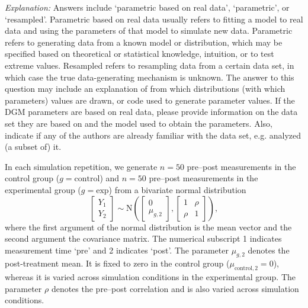 \documentclass[12pt]{article}
\begin{document}
\textit{Explanation:} Answers include `parametric based on real data', `parametric', or `resampled'. Parametric based on real data usually refers to fitting a model to real data and using the parameters of that model to simulate new data. Parametric refers to generating data from a known model or distribution, which may be specified based on theoretical or statistical knowledge, intuition, or to test extreme values. Resampled refers to resampling data from a certain data set, in which case the true data-generating mechanism is unknown. The answer to this question may include an explanation of from which distributions (with which parameters) values are drawn, or code used to generate parameter values. If the DGM parameters are based on real data, please provide information on the data set they are based on and the model used to obtain the parameters. Also, indicate if any of the authors are already familiar with the data set, e.g. analyzed (a subset of) it.

\begin{examplebox}
In each simulation repetition, we generate $n=50$ pre--post measurements in the control group ($g = \text{control}$) and $n = 50$ pre--post measurements in the experimental group ($g = \text{exp}$) from a bivariate normal distribution
\begin{equation}
    \label{eq:bivariateNormal}
    \left[\begin{array}{c}Y_1 \\ Y_2 \end{array}\right] \sim\text{N}\left(\left[\begin{array}{c}0 \\ \mu_{g,2} \end{array}\right],\left[\begin{array}{cc} 1 & \rho  \\ \rho & 1 \end{array}\right]\right),
\end{equation}
where the first argument of the normal distribution is the mean vector and the second argument the covariance matrix.
The numerical subscript 1 indicates measurement time `pre' and 2 indicates `post'. The parameter $\mu_{g,2}$ denotes the post-treatment mean. It is fixed to zero in the control group (${\mu_{\text{control},2}} = 0$), whereas it is varied across simulation conditions in the experimental group. The parameter $\rho$ denotes the pre--post correlation and is also varied across simulation conditions.
\end{examplebox}
\end{document}
